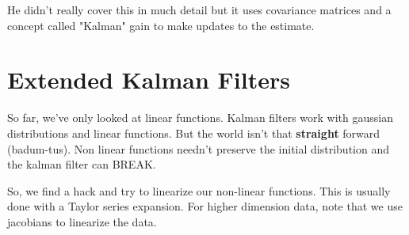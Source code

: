 He didn't really cover this in much detail but it uses covariance matrices and a concept called "Kalman" gain to make updates to the estimate.

\section{Extended Kalman Filters}

So far, we've only looked at linear functions. Kalman filters work with gaussian distributions and linear functions. But the world isn't that \textbf{straight} forward (badum-tus). Non linear functions needn't preserve the initial distribution and the kalman filter can BREAK. 

So, we find a hack and try to linearize our non-linear functions. This is usually done with a Taylor series expansion. For higher dimension data, note that we use jacobians to linearize the data.
